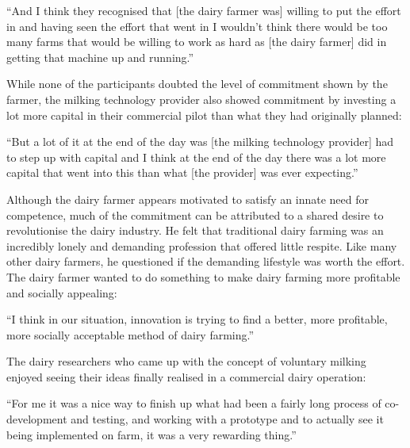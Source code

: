 \begin{displayquote}[Participant 11/2]
\small
\enquote{And I think they recognised that [the dairy farmer was] willing to put the effort in and having seen the effort that went in I wouldn't think there would be too many farms that would be willing to work as hard as [the dairy farmer] did in getting that machine up and running.} 
\end{displayquote}


While none of the participants doubted the level of commitment shown by the farmer, the milking technology provider also showed commitment by investing a lot more capital in their commercial pilot than what they had originally planned:

\begin{displayquote}[Participant 9/2]
\small
\enquote{But a lot of it at the end of the day was [the milking technology provider] had to step up with capital and I think at the end of the day there was a lot more capital that went into this than what [the provider] was ever expecting.} 
\end{displayquote}


Although the dairy farmer appears motivated to satisfy an innate need for competence, much of the commitment can be attributed to a shared desire to revolutionise the dairy industry. He felt that traditional dairy farming was an incredibly lonely and demanding profession that offered little respite. Like many other dairy farmers, he questioned if the demanding lifestyle was worth the effort. The dairy farmer wanted to do something to make dairy farming more profitable and socially appealing:

\begin{displayquote}[Participant 1/2]
\small
\enquote{I think in our situation, innovation is trying to find a better, more profitable, more socially acceptable method of dairy farming.} 
\end{displayquote}


The dairy researchers who came up with the concept of voluntary milking enjoyed seeing their ideas finally realised in a commercial dairy operation:

\begin{displayquote}[Participant 8/2]
\small
\enquote{For me it was a nice way to finish up what had been a fairly long process of co-development and testing, and working with a prototype and to actually see it being implemented on farm, it was a very rewarding thing.} 
\end{displayquote}


